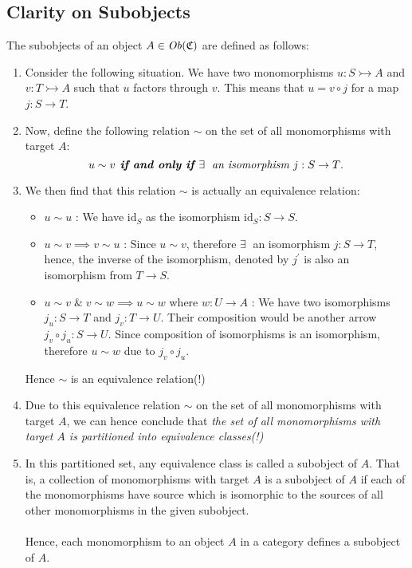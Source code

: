 \documentclass{article}
\theoremstyle{definition}
\theoremstyle{remark}
\theoremstyle{definition}
\theoremstyle{definition}
\theoremstyle{definition}
\newcommand{\cat}[1]{\mathfrak{#1}}
\newcommand{\obj}[1]{\text{\textit{Ob}}(#1)}
\newcommand{\Id}[1]{\text{id}_{#1}}
\begin{document}
\subsection{Clarity on Subobjects}
\label{A-4}
The subobjects of an object $ A \in \obj{\cat{C}}$ are defined as follows:
\begin{enumerate}
	\item {Consider the following situation. We have two monomorphisms $ u : S\rightarrowtail A $ and $ v : T\rightarrowtail A $ such that $ u $ factors through $ v $. This means that $ u = v\circ j $ for a map $ j : S\to T $.}\\
	\item {Now, define the following relation $ \sim $ on the set of all monomorphisms with target $ A $:
\[\text{\emph{$ u\sim v$\textbf{ if and only if }$ \exists\;  $ an isomorphism $ j : S\to T $}.}\]	
}
\item {We then find that this relation $ \sim $ is actually an equivalence relation:
\begin{itemize}
	\item {$ u\sim  u $ : We have $ \Id{S} $ as the isomorphism $ \Id{S} : S\to S $.}
	\item {$ u\sim v \implies v\sim u $ : Since $ u\sim v $, therefore $ \exists  \;$ an isomorphism $ j : S\to T $, hence, the inverse of the isomorphism, denoted by $ j^{\prime} $ is also an isomorphism from $ T\to S $.}
	\item {$ u\sim v \;\&\; v\sim w\implies u\sim w$ where $ w: U\to A $ : We have two isomorphisms $ j_u : S\to T $ and $ j_v : T\to U $. Their composition would be another arrow $ j_v \circ j_u : S\to U$. Since composition of isomorphisms is an isomorphism, therefore $ u\sim w $ due to $ j_v\circ j_u $. }
\end{itemize}
Hence $ \sim $ is an equivalence relation(!)
}
\item {Due to this equivalence relation $ \sim $ on the set of all monomorphisms with target $ A $, we can hence conclude that \emph{the set of all monomorphisms with target $ A $ is partitioned into equivalence classes(!)}}
\item {In this partitioned set, any equivalence class is called a subobject of $ A $. That is, a collection of monomorphisms with target $ A $ is a subobject of $ A $ if each of the monomorphisms have source which is isomorphic to the sources of all other monomorphisms in the given subobject.\\\\
Hence, each monomorphism to an object $ A $ in a category defines a subobject of $ A $.}

\end{enumerate}
\end{document}
